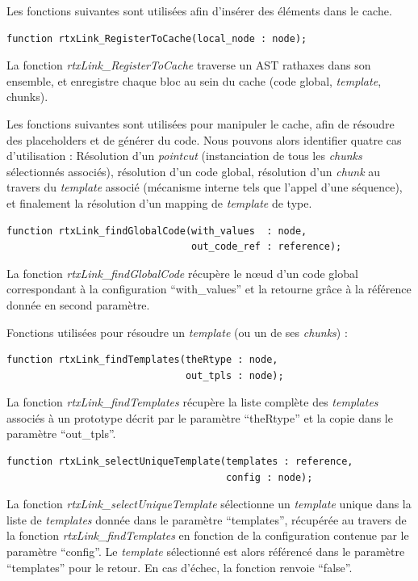 \documentclass[french]{rtxreport}
\begin{document}
\vspace{20pt}

Les fonctions suivantes sont utilisées afin d'insérer des éléments dans le
cache.

\begin{lstlisting}
function rtxLink_RegisterToCache(local_node : node);
\end{lstlisting}
La fonction \emph{rtxLink\_RegisterToCache} traverse un AST rathaxes dans son
ensemble, et enregistre chaque bloc au sein du cache (code global,
\emph{template}, chunks).

\vspace{20pt}

Les fonctions suivantes sont utilisées pour manipuler le cache, afin de
résoudre des placeholders et de générer du code. Nous pouvons alors identifier
quatre cas d'utilisation : Résolution d'un \emph{pointcut} (instanciation de
tous les \emph{chunks} sélectionnés associés), résolution d'un code global,
résolution d'un \emph{chunk} au travers du \emph{template} associé (mécanisme
interne tels que l'appel d'une séquence), et finalement la résolution d'un
mapping de \emph{template} de type.

\begin{lstlisting}
function rtxLink_findGlobalCode(with_values  : node,
                                out_code_ref : reference);
\end{lstlisting}
La fonction \emph{rtxLink\_findGlobalCode} récupère le nœud d'un code global
correspondant à la configuration ``with\_values'' et la retourne grâce à la
référence donnée en second paramètre.

\vspace{20pt}

Fonctions utilisées pour résoudre un \emph{template} (ou un de ses \emph{chunks}) :
\begin{lstlisting}
function rtxLink_findTemplates(theRtype : node,
                               out_tpls : node);
\end{lstlisting}
La fonction \emph{rtxLink\_findTemplates} récupère la liste complète des
\emph{templates} associés à un prototype décrit par le paramètre ``theRtype''
et la copie dans le paramètre ``out\_tpls''.

\begin{lstlisting}
function rtxLink_selectUniqueTemplate(templates : reference,
                                      config : node);
\end{lstlisting}
La fonction \emph{rtxLink\_selectUniqueTemplate} sélectionne un \emph{template}
unique dans la liste de \emph{templates} donnée dans le paramètre ``templates'',
récupérée au travers de la fonction \emph{rtxLink\_findTemplates} en fonction
de la configuration contenue par le paramètre ``config''. Le \emph{template}
sélectionné est alors référencé dans le paramètre ``templates'' pour le retour.
En cas d'échec, la fonction renvoie ``false''.
\end{document}
